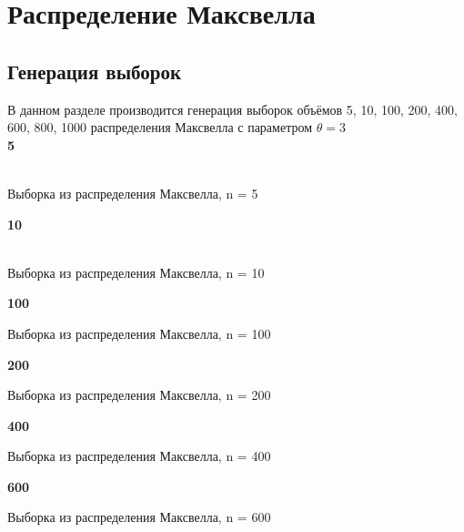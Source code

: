\documentclass[14pt,a4paper,oneside]{extbook}
\begin{document}
    \section{Распределение Максвелла}
    \subsection{Генерация выборок}
    В данном разделе производится генерация выборок объёмов 5, 10, 100, 200, 400, 600, 800, 1000 распределения Максвелла с параметром $\theta = 3$\\
    \textbf{5}\\
    \begin{center}
        \\
        Выборка из распределения Максвелла, n = 5
    \end{center}
    
    \textbf{10}\\
    \begin{center}
        \\
        Выборка из распределения Максвелла, n = 10
    \end{center}
    
    \newpage
    \textbf{100}\\
    \begin{center}
        Выборка из распределения Максвелла, n = 100
    \end{center}
    
    \textbf{200}\\
    \begin{center}
        Выборка из распределения Максвелла, n = 200
    \end{center}
    
    \newpage
    \textbf{400}\\
    \begin{center}
        Выборка из распределения Максвелла, n = 400
    \end{center}
    
    \newpage
    \textbf{600}\\
    \begin{center}
        Выборка из распределения Максвелла, n = 600
    \end{center}
    
\end{document}
